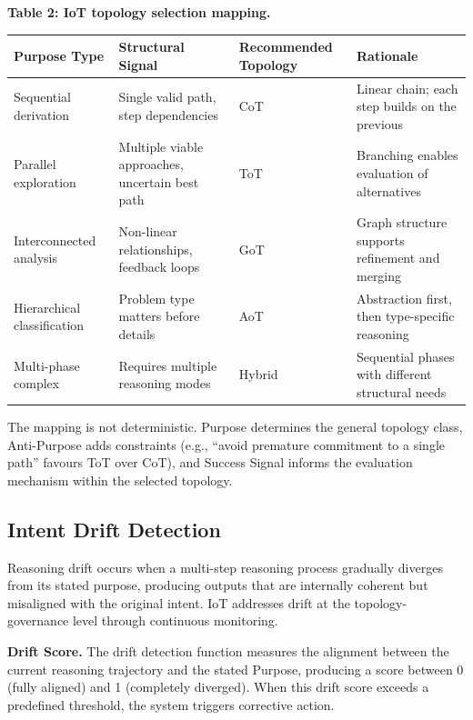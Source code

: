 \documentclass[11pt,a4paper]{article}
\begin{document}
\textbf{Table 2: IoT topology selection mapping.}

{\small\begin{longtable}[]{@{}
  >{\raggedright\arraybackslash}p{}
  >{\raggedright\arraybackslash}p{}
  >{\raggedright\arraybackslash}p{}
  >{\raggedright\arraybackslash}p{}@{}}
\toprule\noalign{}
Purpose Type
 & Structural Signal
 & Recommended Topology
 & Rationale
 \\
\midrule\noalign{}
\endhead
\bottomrule\noalign{}
\endlastfoot
Sequential derivation & Single valid path, step dependencies & CoT &
Linear chain; each step builds on the previous \\
Parallel exploration & Multiple viable approaches, uncertain best path &
ToT & Branching enables evaluation of alternatives \\
Interconnected analysis & Non-linear relationships, feedback loops & GoT
& Graph structure supports refinement and merging \\
Hierarchical classification & Problem type matters before details & AoT
& Abstraction first, then type-specific reasoning \\
Multi-phase complex & Requires multiple reasoning modes & Hybrid &
Sequential phases with different structural needs \\
\end{longtable}}

The mapping is not deterministic. Purpose determines the general
topology class, Anti-Purpose adds constraints (e.g., ``avoid premature
commitment to a single path'' favours ToT over CoT), and Success Signal
informs the evaluation mechanism within the selected topology.

\subsection{Intent Drift Detection}\label{intent-drift-detection}

Reasoning drift occurs when a multi-step reasoning process gradually
diverges from its stated purpose, producing outputs that are internally
coherent but misaligned with the original intent. IoT addresses drift at
the topology-governance level through continuous monitoring.

\textbf{Drift Score.} The drift detection function measures the
alignment between the current reasoning trajectory and the stated
Purpose, producing a score between 0 (fully aligned) and 1 (completely
diverged). When this drift score exceeds a predefined threshold, the
system triggers corrective action.
\end{document}
